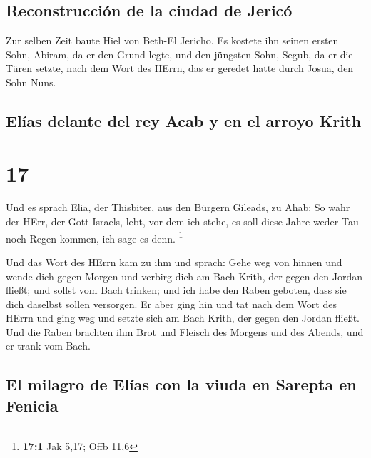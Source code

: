 \hypertarget{reconstrucciuxf3n-de-la-ciudad-de-jericuxf3}{%
\subsection{Reconstrucción de la ciudad de
Jericó}\label{reconstrucciuxf3n-de-la-ciudad-de-jericuxf3}}

 Zur selben Zeit baute Hiel von Beth-El Jericho. Es
kostete ihn seinen ersten Sohn, Abiram, da er den Grund legte, und den
jüngsten Sohn, Segub, da er die Türen setzte, nach dem Wort des HErrn,
das er geredet hatte durch Josua, den Sohn Nuns.

\hypertarget{eluxedas-delante-del-rey-acab-y-en-el-arroyo-krith}{%
\subsection{Elías delante del rey Acab y en el arroyo
Krith}\label{eluxedas-delante-del-rey-acab-y-en-el-arroyo-krith}}

\hypertarget{section-16}{%
\section{17}\label{section-16}}

 Und es sprach Elia, der Thisbiter, aus den Bürgern
Gileads, zu Ahab: So wahr der HErr, der Gott Israels, lebt, vor dem ich
stehe, es soll diese Jahre weder Tau noch Regen kommen, ich sage es
denn. \footnote{\textbf{17:1} Jak 5,17; Offb 11,6}

 Und das Wort des HErrn kam zu ihm und sprach:
 Gehe weg von hinnen und wende dich gegen Morgen und
verbirg dich am Bach Krith, der gegen den Jordan fließt; 
und sollst vom Bach trinken; und ich habe den Raben geboten, dass sie
dich daselbst sollen versorgen.  Er aber ging hin und tat
nach dem Wort des HErrn und ging weg und setzte sich am Bach Krith, der
gegen den Jordan fließt.  Und die Raben brachten ihm Brot
und Fleisch des Morgens und des Abends, und er trank vom Bach.

\hypertarget{el-milagro-de-eluxedas-con-la-viuda-en-sarepta-en-fenicia}{%
\subsection{El milagro de Elías con la viuda en Sarepta en
Fenicia}\label{el-milagro-de-eluxedas-con-la-viuda-en-sarepta-en-fenicia}}


